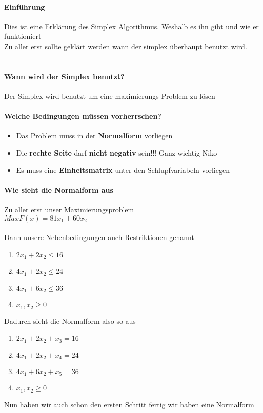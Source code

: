 \documentclass{article}
\begin{document}
\paragraph{Einführung}
Dies ist eine Erklärung des Simplex Algorithmus. Weshalb es ihn gibt und wie er funktioniert\\
Zu aller erst sollte geklärt werden wann der simplex überhaupt benutzt wird.\\\\ 
\paragraph{Wann wird der Simplex benutzt?}
Der Simplex wird benutzt um eine maximierungs Problem zu lösen
\paragraph{Welche Bedingungen müssen vorherrschen?}
\begin{itemize}
	\item{Das Problem muss in der \textbf{Normalform} vorliegen}
	\item{Die \textbf{rechte Seite} darf \textbf{nicht negativ} sein!!! Ganz wichtig Niko}
	\item{Es muss eine \textbf{Einheitsmatrix} unter den Schlupfvariabeln vorliegen}
\end{itemize}
\paragraph{Wie sieht die Normalform aus}
Zu aller erst unser Maximierungsproblem\\
$Max F(x) = 81x_{1} + 60x_{2}$\\\\
Dann unsere Nebenbedingungen auch Restriktionen genannt
\begin{enumerate}
	\item{$2x_{1} + 2x_{2} \leq 16 $}
	\item{$4x_{1} + 2x_{2} \leq 24 $}
	\item{$4x_{1} + 6x_{2} \leq 36 $}
	\item[]{$x_{1},x_{2} \geq 0$}
\end{enumerate}
Dadurch sieht die Normalform also so aus\\
\begin{enumerate}
	\item{$2x_{1} + 2x_{2} + x_{3} = 16 $}
	\item{$4x_{1} + 2x_{2} + x_{4} = 24 $}
	\item{$4x_{1} + 6x_{2} + x_{5} = 36 $}
	\item[]{$x_{1},x_{2} \geq 0$}
\end{enumerate}
Nun haben wir auch schon den ersten Schritt fertig wir haben eine Normalform
\end{document}
